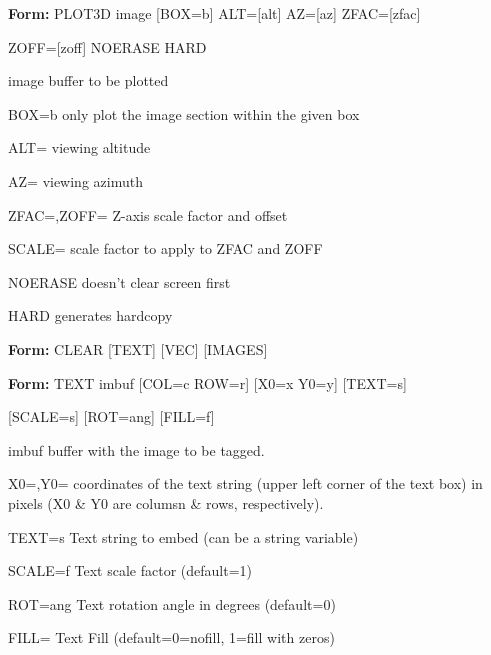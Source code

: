 {\newpage\clearpage
{}%
\begin{command}
  \item[\textbf{Form: }PLOT3D image {[BOX=b]} ALT={[alt]} AZ={[az]} 
   ZFAC={[zfac]}\hfill]{}
  \item{ZOFF={[zoff]} NOERASE HARD}
  \item[image]{buffer to be plotted}
  \item[BOX=b]{only plot the image section within the given box}
  \item[ALT=]{viewing altitude}
  \item[AZ=]{viewing azimuth}
  \item[ZFAC=,ZOFF=]{Z-axis scale factor and offset}
  \item[SCALE=]{scale factor to apply to ZFAC and ZOFF}
  \item[NOERASE]{doesn't clear screen first}
  \item[HARD]{generates hardcopy}
\end{command}%
\lthtmlfigureZ
\lthtmlcheckvsize\clearpage}

{\newpage\clearpage
{}%
\begin{command}
  \item[\textbf{Form: } CLEAR {[TEXT]} {[VEC]} {[IMAGES]}\hfill]{}
\end{command}%
\lthtmlfigureZ
\lthtmlcheckvsize\clearpage}

{\newpage\clearpage
{}%
\begin{command}
  \item[\textbf{Form: }TEXT  imbuf {[COL=c ROW=r]} {[X0=x Y0=y]} 
       {[TEXT=s]}\hfill]{}
  \item[]{{[SCALE=s]} {[ROT=ang]} {[FILL=f]}}
  \item[imbuf]{   buffer with the image to be tagged.}
  \item[X0=,Y0=]{coordinates of the text string (upper left corner of
       the text box) in pixels (X0 \& Y0 are columsn \& rows, respectively).}
  \item[TEXT=s]{Text string to embed (can be a string variable)}
  \item[SCALE=f]{Text scale factor (default=1)}
  \item[ROT=ang]{Text rotation angle in degrees (default=0)}
  \item[FILL=]  {Text Fill (default=0=nofill, 1=fill with zeros)}
\end{command}%
\lthtmlfigureZ
\lthtmlcheckvsize\clearpage}

